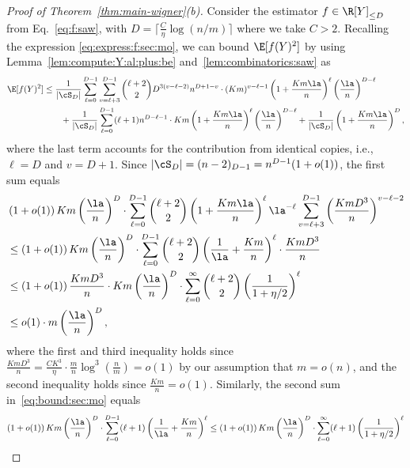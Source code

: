 \documentclass[11pt]{article}
\begin{document}
\begin{proof}[Proof of Theorem~\ref{thm:main-wigner}(b)]
Consider the estimator $f \in \R[Y]_{\leq D}$ from Eq.~\eqref{eq:f:saw}, 
with $D = \lceil \frac{C}{\eta}\log (n/m) \rceil$ where we take $C>2$. Recalling the expression \eqref{eq:express:f:sec:mo}, we can bound $\E[f(Y)^2]$ by using Lemma~\ref{lem:compute:Y:al:plus:be} and~\ref{lem:combinatorics:saw} as
\begin{equation}\label{eq:bound:sec:mo}
\begin{split}
\E[f(Y)^2]
&\leq\frac{1}{|\cS_D|}\sum_{\ell=0}^{D-1}\sum_{v=\ell+3}^{D-1}\binom{\ell+2}{2}D^{3(v-\ell-2)}n^{D+1-v}\cdot (Km)^{v-\ell-1}\left(1+\frac{Km\la}{n}\right)^{\ell}\left(\frac{\la}{n}\right)^{D-\ell}\\
&\quad\quad+\frac{1}{|\cS_D|}\sum_{\ell=0}^{D-1}(\ell+1)n^{D-\ell-1}\cdot Km\left(1+\frac{Km\la}{n}\right)^{\ell}\left(\frac{\la}{n}\right)^{D-\ell}+\frac{1}{|\cS_D|}\left(1+\frac{Km\la}{n}\right)^D,
\end{split}
\end{equation}
where the last term accounts for the contribution from identical copies, i.e., $\ell=D$ and $v=D+1$. Since $|\cS_D|=(n-2)_{D-1}=n^{D-1}(1+o(1))$, the first sum equals
\[
\begin{split}
&\left(1+o(1)\right)Km\left(\frac{\la}{n}\right)^{D}\cdot \sum_{\ell=0}^{D-1}\binom{\ell+2}{2}\left(1+\frac{Km\la}{n}\right)^{\ell}\la^{-\ell}\sum_{v=\ell+3}^{D-1}\left(\frac{KmD^3}{n}\right)^{v-\ell-2}\\
&\leq \left(1+o(1)\right)Km\left(\frac{\la}{n}\right)^{D}\cdot \sum_{\ell=0}^{D-1}\binom{\ell+2}{2}\left(\frac{1}{\la}+\frac{Km}{n}\right)^{\ell}\cdot \frac{KmD^3}{n}\\
&\leq \left(1+o(1)\right)\frac{KmD^3}{n}\cdot Km\left(\frac{\la}{n}\right)^{D}\cdot \sum_{\ell=0}^{\infty}\binom{\ell+2}{2}\left(\frac{1}{1+\eta/2}\right)^{\ell}\\
&\leq o(1)\cdot m\left(\frac{\la}{n}\right)^{D},
\end{split}
\]
where the first and third inequality holds since $\frac{KmD^3}{n} = \frac{CK^3}{\eta}\cdot \frac{m}{n}\log^3(\frac{n}{m})= o(1)$ by our assumption that $m=o(n)$, and the second inequality holds since $\frac{Km}{n}=o(1)$. Similarly, the second sum in~\eqref{eq:bound:sec:mo} equals
\[
\begin{split}
\left(1+o(1)\right)Km\left(\frac{\la}{n}\right)^{D}\cdot \sum_{\ell=0}^{D-1}(\ell+1)\left(\frac{1}{\la}+\frac{Km}{n}\right)^{\ell}
&\leq \left(1+o(1)\right)Km\left(\frac{\la}{n}\right)^{D}\cdot \sum_{\ell=0}^{\infty}(\ell+1)\left(\frac{1}{1+\eta/2}\right)^{\ell}\\

\end{split}\]
\end{proof}
\end{document}
